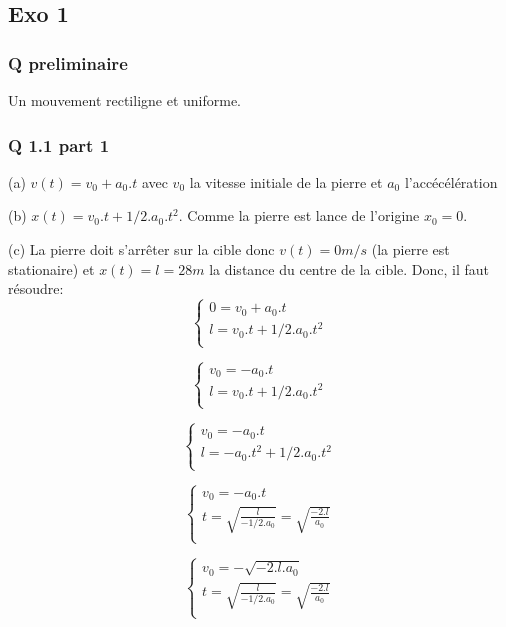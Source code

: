 \documentclass[]{book}
\theoremstyle{definition}
\begin{document}
\subsection*{Exo 1}
\subsubsection*{Q preliminaire}
Un mouvement rectiligne et uniforme.

\subsubsection*{Q 1.1 part 1}
(a) $v(t) = v_0 + a_0.t$ avec $v_0$ la vitesse initiale de la pierre et $a_0$ l'acc\'ec\'el\'eration


(b) $x(t) = v_0.t + 1/2.a_0.t^2$. Comme la pierre est lance de l'origine $x_0 = 0$.


(c) La pierre doit s'arr\^eter sur la cible donc $v(t)=0m/s$ (la pierre est stationaire) 
et $x(t) = l = 28m$ la distance du centre de la cible. Donc, il faut r\'esoudre:
$$
\left\{ 
\begin{array}{l}
0 = v_0 + a_0.t \\
l = v_0.t + 1/2.a_0.t^2\\
\end{array}
\right. 
$$

$$
\left\{ 
\begin{array}{l}
v_0 = - a_0.t \\
l = v_0.t + 1/2.a_0.t^2\\
\end{array}
\right. 
$$

$$
\left\{ 
\begin{array}{l}
v_0 = - a_0.t \\
l = - a_0.t^2 + 1/2.a_0.t^2\\
\end{array}
\right. 
$$

$$
\left\{ 
\begin{array}{l}
v_0 = - a_0.t \\
t = \sqrt{\frac{l}{-1/2.a_0}} = \sqrt{\frac{-2.l}{a_0}}\\
\end{array}
\right. 
$$

$$
\left\{ 
\begin{array}{l}
v_0 = - \sqrt{-2.l.a_0} \\
t = \sqrt{\frac{l}{-1/2.a_0}} = \sqrt{\frac{-2.l}{a_0}}\\
\end{array}
\right. 
$$
\end{document}
